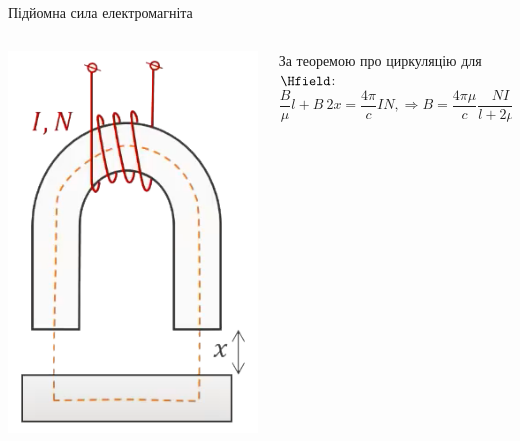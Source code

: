 \documentclass[onlytextwidth]{beamer}
\begin{document}
\begin{frame}{Підйомна сила електромагніта}{}
	\begin{columns}
		\begin{column}{0.25\linewidth}
			\includegraphics[width=\linewidth]{electromagnet_force}
		\end{column}
		\begin{column}{0.75\linewidth}
			\begin{block}{}\justifying
				За теоремою про циркуляцію для $\Hfield$:
				\begin{equation*}
					\frac{B}{\mu} l + B\ 2x = \frac{4\pi}{c} IN, \Rightarrow B = \frac{4\pi\mu}{c} \frac{NI}{l + 2\mu x},
				\end{equation*}

\end{block}
\end{column}
\end{columns}
\end{frame}
\end{document}
